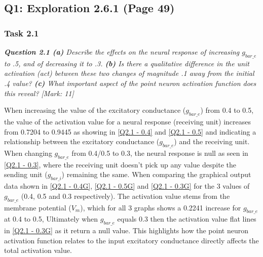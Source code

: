 \subsection{Q1: Exploration 2.6.1 (Page 49)}
\label{Q1:Expl 2.6.1 SubSection}

\subsubsection{Task 2.1}
\label{Q1:Expl 2.6.1(2.1) SubSubSection}

\begin{tcolorbox}[colback=gray!20!white,colframe=gray!20!white]
  \emph{\textbf{Question 2.1 (a)} Describe the effects on the neural response of increasing $g_{bar\_e}$ to .5, and of decreasing it to .3. \textbf{(b)} Is there a qualitative difference in the unit activation (act) between these two changes of magnitude .1 away from the initial .4 value? \textbf{(c)} What important aspect of the point neuron activation function does this reveal? [Mark: 11]} 
\end{tcolorbox} 
\vspace{0.5cm}

When increasing the value of the excitatory conductance ($g_{bar\_e}$) from 0.4 to 0.5, the value of the activation value for a neural response (receiving unit) increases from 0.7204 to 0.9445 as showing in \cref{Q2.1 - 0.4} and \cref{Q2.1 - 0.5} and indicating a relationship between the excitatory conductance ($g_{bar\_e}$) and the receiving unit. When changing $g_{bar\_e}$ from 0.4/0.5 to 0.3, the neural response is null as seen in \cref{Q2.1 - 0.3}, where the receiving unit doesn't pick up any value despite the sending unit ($g_{bar\_i}$) remaining the same. When comparing the graphical output data shown in \cref{Q2.1 - 0.4G}, \cref{Q2.1 - 0.5G} and \cref{Q2.1 - 0.3G} for the 3 values of $g_{bar\_e}$ (0.4, 0.5 and 0.3 respectively). The activation value stems from the membrane potential ($V_m$), which for all 3 graphs shows a 0.2241 increase for $g_{bar\_e}$ at 0.4 to 0.5, Ultimately when $g_{bar\_e}$ equals 0.3 then the activation value flat lines in \cref{Q2.1 - 0.3G} as it return a null value. This highlights how the point neuron activation function relates to the input excitatory conductance directly affects the total activation value.


